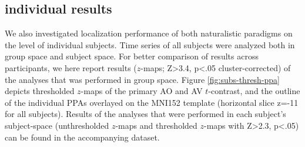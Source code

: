 \documentclass[english]{article}
\begin{document}
\subsection{individual results}


We also investigated localization performance of both naturalistic paradigms on
the level of individual subjects.
Time series of all subjects were analyzed both in group space and subject space.
For better comparison of results across participants, we here report results
($z$-maps; Z>3.4, p<.05 cluster-corrected) of the analyses that was performed in
group space.
Figure \ref{fig:subs-thresh-ppa} depicts thresholded $z$-maps of the primary AO
and AV $t$-contrast, and the outline of the individual PPAs
\citep{sengupta2016extension} overlayed on the MNI152 template (horizontal slice
z=-11 for all subjects).
Results of the analyses that were performed in each subject's subject-space
(unthresholded $z$-maps and thresholded $z$-maps with Z>2.3, p<.05) can be found
in the accompanying dataset.
\end{document}
